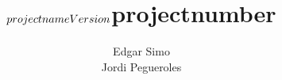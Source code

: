 \documentclass[a4paper]{book}
\begin{document}
\title{ 
\vspace{6cm}
$projectname \\ Version $projectnumber }
\author{Edgar Simo \\ Jordi Pegueroles}
\maketitle

\vspace{4cm}


\newpage

\end{document}
